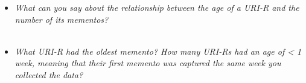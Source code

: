 \documentclass[12pt]{article}
\begin{document}
\begin{itemize}
    \item \emph{What can you say about the relationship between the age of a URI-R and the number of its mementos?}
       \emph{\\  \\ \color{blue}{Answer}}

    \item \emph{What URI-R had the oldest memento? How many URI-Rs had an age of < 1 week, meaning that their first memento was captured the same week you collected the data?}
        \emph{\\  \\ \color{blue}{Answer}}


\end{itemize}
\end{document}
